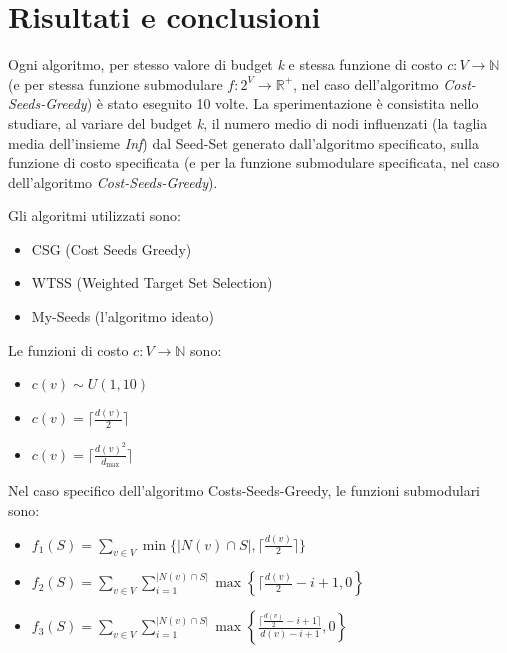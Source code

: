 \section{Risultati e conclusioni}

Ogni  algoritmo, per stesso valore di budget \textit{k} e stessa funzione di costo \( c : V \rightarrow \mathbb{N} \) (e per stessa funzione submodulare \( f : 2^V \rightarrow \mathbb{R}^+ \), nel caso dell'algoritmo \textit{Cost-Seeds-Greedy}) è stato eseguito 10 volte. La sperimentazione è consistita nello studiare, al variare del budget \textit{k}, il numero medio di nodi influenzati (la taglia media dell'insieme \textit{Inf}) dal Seed-Set generato dall'algoritmo specificato, sulla funzione di costo specificata (e per la funzione submodulare specificata, nel caso dell'algoritmo \textit{Cost-Seeds-Greedy}).

Gli algoritmi utilizzati sono:
\begin{itemize}
  \item CSG (Cost Seeds Greedy)
  \item WTSS (Weighted Target Set Selection)
  \item My-Seeds (l'algoritmo ideato)
\end{itemize}

Le funzioni di costo \( c : V \rightarrow \mathbb{N} \) sono:

\begin{itemize}
  \item \(c(v) \sim U(1,10)\) 
  \item \(c(v) = \lceil \frac{d(v)}{2} \rceil\)
  \item \(c(v) = \lceil \frac{d(v)^2}{d_{\text{max}}} \rceil\)
\end{itemize}

Nel caso specifico dell'algoritmo Costs-Seeds-Greedy, le funzioni submodulari sono:

\begin{itemize}
  \item \(f_1(S) = \sum_{v \in V} \min\{|N(v) \cap S|, \lceil \frac{d(v)}{2} \rceil\}\) 
  \item \(
f_2(S) = \sum_{v \in V} \sum_{i=1}^{|N(v) \cap S|} \max\left\{\lceil \frac{d(v)}{2} - i + 1, 0 \right\}
\)
  \item \(
f_3(S) = \sum_{v \in V} \sum_{i=1}^{|N(v) \cap S|} \max\left\{\frac{\lceil \frac{d(v)}{2} - i + 1 \rceil}{d(v) - i + 1}, 0 \right\}
\)
\end{itemize}

